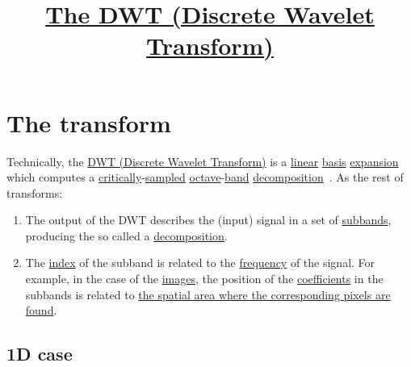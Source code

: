 
\title{\href{https://vicente-gonzalez-ruiz.github.io/DWT/docs/}{The DWT (Discrete Wavelet Transform)}}

\maketitle
\tableofcontents
     
\section{The transform}

Technically, the
\href{https://en.wikipedia.org/wiki/Discrete_wavelet_transform}{DWT
  (Discrete Wavelet Transform)} is a
\href{https://en.wikipedia.org/wiki/Linearity}{linear}
\href{https://en.wikipedia.org/wiki/Change_of_basis}{basis}
\href{https://www.youtube.com/watch?v=P2LTAUO1TdA}{expansion} which
computes a
\href{https://www.dsprelated.com/freebooks/sasp/Critically_Sampled_Perfect_Reconstruction.html}{critically}-\href{https://en.wikipedia.org/wiki/Nyquist-Shannon_sampling_theorem}{sampled}
\href{https://en.wikipedia.org/wiki/Octave_(electronics)}{octave}-\href{https://en.wikipedia.org/wiki/Frequency_band}{band}
\href{https://www.sciencedirect.com/topics/engineering/wavelet-decomposition}{decomposition}~\cite{vetterli2014foundations,kovacevic2013fourier}. As the rest of transforms:
\begin{enumerate}
\item The output of the DWT describes the (input) signal in a set of
  \href{https://en.wikipedia.org/wiki/Sub-band_coding}{subbands},
  producing the so called a
  \href{https://en.wikipedia.org/wiki/Discrete_wavelet_transform}{decomposition}.
\item The
  \href{https://en.wikipedia.org/wiki/Array_data_structure#Element_identifier_and_addressing_formulas}{index}
  of the subband is related to the
  \href{https://en.wikipedia.org/wiki/Frequency}{frequency} of the
  signal. For example, in the case of the
  \href{https://en.wikipedia.org/wiki/Digital_image}{images}, the
  position of the
  \href{https://en.wikipedia.org/wiki/Coefficient}{coefficients} in
  the subbands is related to
  \href{https://en.wikipedia.org/wiki/Discrete_wavelet_transform#/media/File:Jpeg2000_2-level_wavelet_transform-lichtenstein.png}{the
    spatial area where the corresponding pixels are found}.
\end{enumerate}

\subsection{1D case}

